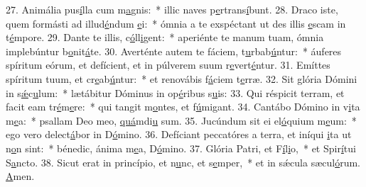 27. Animália pus\uline{í}lla cum m\uline{a}gnis:~* illic naves p\uline{e}rtrans\uline{í}bunt.
28. Draco iste, quem formásti ad illud\uline{é}ndum \uline{e}i:~* ómnia a te exspéctant ut des illis \uline{e}scam in t\uline{é}mpore.
29. Dante te illis, c\uline{ó}ll\uline{i}gent:~* aperiénte te manum tuam, ómnia implebúntur b\uline{o}nit\uline{á}te.
30. Averténte autem te fáciem, t\uline{u}rbab\uline{ú}ntur:~* áuferes spíritum eórum, et defícient, et in púlverem suum r\uline{e}vert\uline{é}ntur.
31. Emíttes spíritum tuum, et cr\uline{e}ab\uline{ú}ntur:~* et renovábis f\uline{á}ciem t\uline{e}rræ.
32. Sit glória Dómini in s\uline{ǽ}c\uline{u}lum:~* lætábitur Dóminus in op\uline{é}ribus s\uline{u}is:
33. Qui réspicit terram, et facit eam tr\uline{é}m\uline{e}re:~* qui tangit m\uline{o}ntes, et f\uline{ú}migant.
34. Cantábo Dómino in v\uline{i}ta m\uline{e}a:~* psallam Deo meo, \uline{quá}mdi\uline{u} sum.
35. Jucúndum sit ei el\uline{ó}quium m\uline{e}um:~* ego vero delect\uline{á}bor in D\uline{ó}mino.
36. Defíciant peccatóres a terra, et iníqui \uline{i}ta ut n\uline{o}n sint:~* bénedic, ánima m\uline{e}a, D\uline{ó}mino.
37. Glória Patri, et F\uline{í}l\uline{i}o,~* et Spir\uline{í}tui S\uline{a}ncto.
38. Sicut erat in princípio, et n\uline{u}nc, et s\uline{e}mper,~* et in sǽcula sæcul\uline{ó}rum. \uline{A}men.
